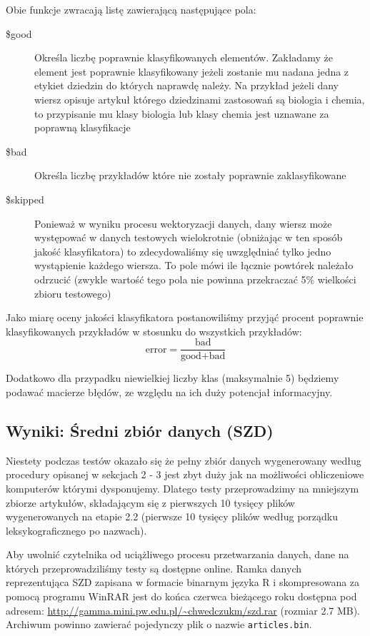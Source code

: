 \documentclass[a4paper,12pt]{article}
\begin{document}
		Obie funkcje zwracają listę zawierającą następujące pola:
		\begin{description}
			\item[\$good] 
				Określa liczbę poprawnie klasyfikowanych elementów.
				Zakładamy że element jest poprawnie klasyfikowany 
				jeżeli zostanie mu nadana jedna z etykiet dziedzin
				do których naprawdę należy. Na przykład jeżeli
				dany wiersz opisuje artykuł którego dziedzinami
				zastosowań są biologia i chemia, to przypisanie 
				mu klasy biologia lub klasy chemia jest uznawane 
				za poprawną klasyfikacje
			\item[\$bad]
				Określa liczbę przykładów które nie zostały poprawnie
				zaklasyfikowane
			\item[\$skipped]
				Ponieważ w wyniku procesu wektoryzacji danych, dany 
				wiersz może występować w danych testowych wielokrotnie
				(obniżając w ten sposób jakość klasyfikatora) to zdecydowaliśmy
				się uwzględniać tylko jedno wystąpienie każdego wiersza.
				To pole mówi ile łącznie powtórek należało odrzucić
				(zwykle wartość tego pola nie powinna przekraczać 5\% wielkości
				zbioru testowego)
		\end{description}

		Jako miarę oceny jakości klasyfikatora postanowiliśmy przyjąć
		procent poprawnie klasyfikowanych przykładów w stosunku do 
		wszystkich przykładów:
		\[ \text{error} = \frac{\text{bad}}{\text{good}+\text{bad}} \]
		
		Dodatkowo dla przypadku niewielkiej liczby klas (maksymalnie 5)
		będziemy podawać macierze błędów, ze względu na ich 
		duży potencjał informacyjny.
		
	\subsection{Wyniki: Średni zbiór danych (SZD)}
		Niestety podczas testów okazało się że pełny zbiór danych
		wygenerowany według procedury opisanej w sekcjach 2 - 3 jest
		zbyt duży jak na możliwości obliczeniowe komputerów którymi dysponujemy.
		Dlatego testy przeprowadzimy na mniejszym zbiorze
		artykułów, składającym się z pierwszych 10 tysięcy plików
		wygenerowanych na etapie 2.2 (pierwsze 10 tysięcy plików według
		porządku leksykograficznego po nazwach).
		
		Aby uwolnić czytelnika od uciążliwego procesu przetwarzania 
		danych, dane na których przeprowadziliśmy testy są 
		dostępne online.
		Ramka danych reprezentująca SZD
		zapisana w formacie binarnym języka R i skompresowana
		za pomocą programu WinRAR jest do końca czerwca bieżącego roku
		dostępna pod adresem: \url{http://gamma.mini.pw.edu.pl/~chwedczukm/szd.rar}
		(rozmiar 2.7 MB). Archiwum powinno zawierać pojedynczy plik o nazwie
		\texttt{articles.bin}.
		
\end{document}
